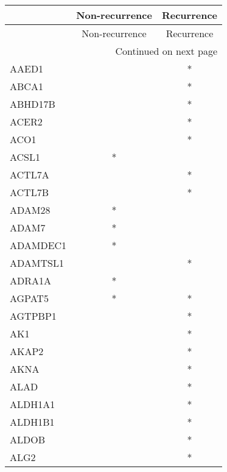\begin{longtable}{lcc}
\toprule
{} & Non-recurrence & Recurrence \\
\midrule
\endfirsthead

\toprule
{} & Non-recurrence & Recurrence \\
\midrule
\endhead
\midrule
\multicolumn{3}{r}{{Continued on next page}} \\
\midrule
\endfoot

\bottomrule
\endlastfoot
AAED1                 &                &          * \\
ABCA1                 &                &          * \\
ABHD17B               &                &          * \\
ACER2                 &                &          * \\
ACO1                  &                &          * \\
ACSL1                 &              * &            \\
ACTL7A                &                &          * \\
ACTL7B                &                &          * \\
ADAM28                &              * &            \\
ADAM7                 &              * &            \\
ADAMDEC1              &              * &            \\
ADAMTSL1              &                &          * \\
ADRA1A                &              * &            \\
AGPAT5                &              * &          * \\
AGTPBP1               &                &          * \\
AK1                   &                &          * \\
AKAP2                 &                &          * \\
AKNA                  &                &          * \\
ALAD                  &                &          * \\
ALDH1A1               &                &          * \\
ALDH1B1               &                &          * \\
ALDOB                 &                &          * \\
ALG2                  &                &          * \\

\end{longtable}
